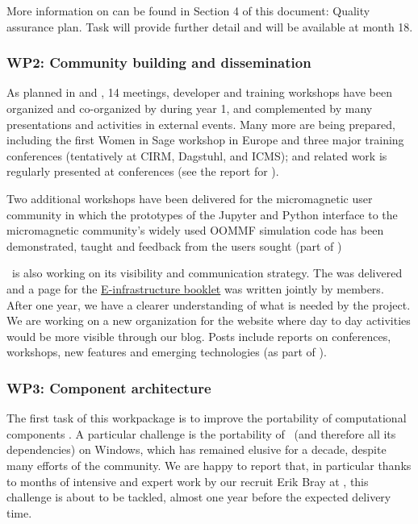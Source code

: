 \documentclass{deliverablereport}
\begin{document}
More information on
 can be found in
Section 4 of this document: Quality assurance plan.
Task  will provide
further detail and will be available at month 18.



\subsubsection{WP2: Community building and dissemination}

As planned in  and
, 14 meetings, developer and
training workshops have been organized and co-organized by \ODK during
year 1, and complemented by many presentations and activities in
external events.  Many more are being prepared, including the first
Women in Sage workshop in Europe and three major training conferences
(tentatively at CIRM, Dagstuhl, and ICMS); \ODK and \ODK related work
is regularly presented at conferences (see the report for
).

Two additional workshops have been delivered for the micromagnetic user community
in which the prototypes of the Jupyter and Python interface to the
micromagnetic community's widely used OOMMF simulation code has been demonstrated,
taught and feedback from the users sought (part of
)

\ODK\ is also working on its visibility and communication strategy. The
 was delivered and a page for the
\href{https://github.com/OpenDreamKit/OpenDreamKit/blob/master/Communication/eInfra-Booklet/ODK.md}{E-infrastructure
  booklet} was written jointly by \ODK members. After one year, we have a clearer
understanding of what is needed by the project.  We are working on a new organization for
the website where day to day activities would be more visible through our blog. Posts
include reports on conferences, workshops, new features and emerging technologies (as part
of ).


\subsubsection{WP3: Component architecture}

The first task of this workpackage is to improve the portability of
computational components
. A particular
challenge is the portability of \Sage\ (and therefore all its
dependencies) on Windows, which has remained elusive for a decade,
despite many efforts of the community. We are happy to report that, in
particular thanks to months of intensive and expert work by our
recruit Erik Bray at , this challenge is about to be
tackled, almost one year before the expected delivery time.
\end{document}
